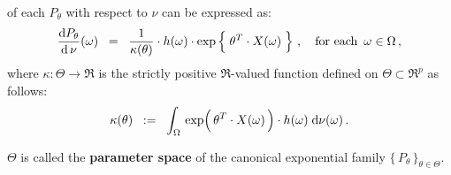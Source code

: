 \begin{definition}
\begin{enumerate}
	of each $P_{\theta}$ with respect to $\nu$ can be expressed as:
	\begin{equation*}
	\dfrac{\d P_{\theta}}{\d\,\nu}(\omega)
	\;\; = \;\;
		\dfrac{1}{\kappa(\theta)}
		\cdot
		h(\omega)
		\cdot
		\exp\left\{\; \theta^{T} \!\overset{{\color{white}-}}{\cdot}\! X(\omega) \;\right\}
		\,,
		\quad
		\textnormal{for each \,$\omega\in\Omega$}\,,
	\end{equation*}
	where $\kappa : \Theta \longrightarrow \Re$ is the strictly positive
	$\Re$-valued function defined on $\Theta \subset \Re^{p}$ as follows:
	\begin{equation*}
	\kappa(\theta)
	\;\; := \;\;
		\int_{\Omega}\,
			\exp\!\left(\,\theta^{T} \!\overset{{\color{white}-}}{\cdot}\! X(\omega)\,\right) \cdot h(\omega)
		\;\d\nu(\omega)\,.
	\end{equation*}
\end{enumerate}
$\Theta$ is called the \textbf{parameter space} of
the canonical exponential family $\{\,P_{\theta}\,\}_{\theta\in\Theta}$.
\end{definition}


